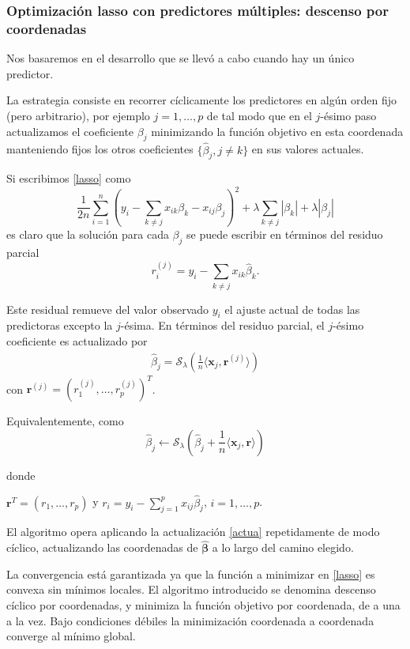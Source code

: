 \documentclass{report}
\begin{document}
\subsubsection*{Optimización lasso con predictores múltiples: descenso por coordenadas }


 Nos basaremos en el desarrollo que se llevó a cabo cuando hay un único predictor. 


 La estrategia consiste en recorrer cíclicamente los predictores en algún orden fijo (pero arbitrario), por ejemplo $j=1, \ldots, p$ de tal modo que en el $j$-ésimo paso actualizamos el coeficiente $\beta_j$ minimizando la función objetivo en esta coordenada manteniendo fijos los otros coeficientes $\{\widehat{\beta}_j, j\neq k\}$ en sus valores actuales.


 Si escribimos \eqref{lasso} como 
$$
\frac{1}{2 n} \sum_{i=1}^n\left(y_i-\sum_{k \neq j} x_{i k} \beta_k-x_{i j} \beta_j\right)^2+\lambda \sum_{k \neq j}\left|\beta_k\right|+\lambda\left|\beta_j\right|
$$
es claro que la solución para cada $\beta_j$ se puede escribir en términos del residuo parcial 
$$r_i^{(j)}=y_i-\sum_{k\neq j}x_{ik}\widehat{\beta}_k.$$ 


 Este residual remueve del valor observado $y_i$ el ajuste actual de todas las predictoras excepto la $j$-ésima. En términos del residuo parcial, el $j$-ésimo coeficiente es actualizado por 
\begin{eqnarray}\label{actua}
\widehat{\beta}_j= \mathcal{S}_\lambda(\frac{1}{n}\langle\mathbf{x}_j, \mathbf{r}^{(j)}\rangle) 
\end{eqnarray}
con $\mathbf{r}^{(j)}=(r_1^{(j)}, \ldots, r_p^{(j)})^T$.


 Equivalentemente, como 
$$ \widehat{\beta}_j \leftarrow \mathcal{S}_\lambda( \widehat{\beta}_j+ \frac{1}{n}\langle\mathbf{x}_j, \mathbf{r}\rangle)$$

donde 

$\mathbf{r}^T=(r_1,\ldots,r_p)$ y  $r_i=y_i-\sum_{j=1}^p x_{i j} \widehat{\beta}_j$, $i=1,\ldots, p$.


 El algoritmo opera aplicando la actualización \eqref{actua} repetidamente de modo cíclico, actualizando las coordenadas de $\widehat{\boldsymbol{\beta}}$ a lo largo del camino elegido. 
 

 La convergencia está garantizada ya que la función a minimizar en \eqref{lasso} es convexa sin mínimos locales. El algoritmo introducido se denomina descenso cíclico por coordenadas, y minimiza la función objetivo  por coordenada, de a una a la vez. Bajo condiciones débiles la minimización coordenada a coordenada converge al mínimo global. 
 
\end{document}
